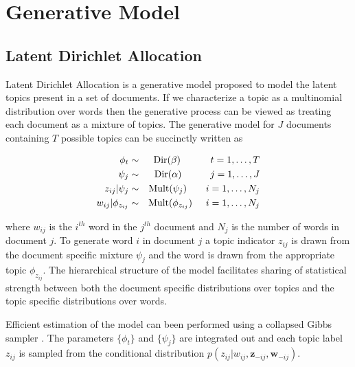 \section{Generative Model}

\newcommand{\G}{\mathcal{G}}
\newcommand{\LM}{\mathcal{L}\mathcal{M}}
\newcommand{\bu}{{\bf u}}
\newcommand{\PY}{\mathcal{P}\mathcal{Y}}
\newcommand{\D}{\mathcal{D}}
\newcommand{\LA}{\mathcal{L}}

\subsection{Latent Dirichlet Allocation}

Latent Dirichlet Allocation \cite{Blei and Jordan} is a generative model proposed to model the latent topics present in a set of documents.  If we characterize a topic as a multinomial distribution over words then the generative process can be viewed as treating each document as a mixture of topics. The generative model for $J$ documents containing $T$ possible topics can be succinctly written as 

\begin{eqnarray}
\phi_t  &\sim& \textrm{Dir}(\beta)  \hspace{1.1cm} t = 1,\ldots,T \nonumber \\
\psi_j &\sim& \textrm{Dir}(\alpha) \hspace{1.05cm} j = 1,\ldots, J\nonumber \\
z_{ij} | \psi_j &\sim& \textrm{Mult}(\psi_j) \hspace{.7cm} i = 1,\ldots, N_j \nonumber \\
w_{ij} | \phi_{z_{ij}} &\sim& \textrm{Mult}(\phi_{z_{ij}}) \hspace{.5cm} i = 1,\ldots, N_j 
\end{eqnarray}

where $w_{ij}$ is the $i^{th}$ word in the $j^{th}$ document and $N_j$ is the number of words in document $j$. To generate word $i$ in document $j$ a topic indicator $z_{ij}$ is drawn from the document specific mixture $\psi_j$ and the word is drawn from the appropriate topic $\phi_{z_{ij}}$.  The hierarchical structure of the model facilitates sharing of statistical strength between both the document specific distributions over topics and the topic specific distributions over words.

Efficient estimation of the model can been performed using a collapsed Gibbs sampler \cite{Griffiths2004}.  The parameters $\{ \phi_t \}$ and $\{ \psi_j \}$ are integrated out and each topic label $z_{ij}$ is sampled from the conditional distribution $p(z_{ij} | w_{ij}, \mathbf{z}_{-ij}, \mathbf{w}_{-ij})$.

